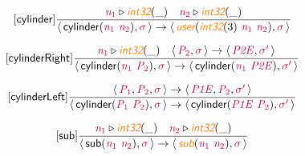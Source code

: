 \documentclass[10pt,leqno,fleqn]{article}
\newcommand{\artVariable}[1]{\mbox{\color{purple}\em #1\/}}
\newcommand{\artConstructor}[1]{\mbox{\sf #1}}
\newcommand{\artSpecial}[1]{\mbox{\color{orange}\sf\em #1}}
\begin{document}
\begin{equation}
\tag*{[\artConstructor{\sf cylinder}]}
\begin{split}\frac{ \artVariable{n$_{1}$}\triangleright \artSpecial{int32}(\_) \quad  \artVariable{n$_{2}$}\triangleright \artSpecial{int32}(\_) }{\langle\, \artConstructor{\sf cylinder}(\artVariable{n$_{1}$}\ \artVariable{n$_{2}$}), \artVariable{$\sigma$}\,\rangle \rightarrow \langle\, \artSpecial{user}(\artSpecial{int32}(3)\ \artVariable{n$_{1}$}\ \artVariable{n$_{2}$}), \artVariable{$\sigma$}\,\rangle }
\end{split}
\end{equation}

\begin{equation}
\tag*{[\artConstructor{\sf cylinderRight}]}
\begin{split}\frac{ \artVariable{n$_{1}$}\triangleright \artSpecial{int32}(\_) \quad \langle\, \artVariable{P$_{2}$}, \artVariable{$\sigma$}\,\rangle \rightarrow \langle\, \artVariable{P2E}, \artVariable{$\sigma$\/$^\prime$}\,\rangle }{\langle\, \artConstructor{\sf cylinder}(\artVariable{n$_{1}$}\ \artVariable{P$_{2}$}), \artVariable{$\sigma$}\,\rangle \rightarrow \langle\, \artConstructor{\sf cylinder}(\artVariable{n$_{1}$}\ \artVariable{P2E}), \artVariable{$\sigma$\/$^\prime$}\,\rangle }
\end{split}
\end{equation}

\begin{equation}
\tag*{[\artConstructor{\sf cylinderLeft}]}
\begin{split}\frac{\langle\, \artVariable{P$_{1}$}, \artVariable{P$_{2}$}, \artVariable{$\sigma$}\,\rangle \rightarrow \langle\, \artVariable{P1E}, \artVariable{P$_{2}$}, \artVariable{$\sigma$\/$^\prime$}\,\rangle }{\langle\, \artConstructor{\sf cylinder}(\artVariable{P$_{1}$}\ \artVariable{P$_{2}$}), \artVariable{$\sigma$}\,\rangle \rightarrow \langle\, \artConstructor{\sf cylinder}(\artVariable{P1E}\ \artVariable{P$_{2}$}), \artVariable{$\sigma$\/$^\prime$}\,\rangle }
\end{split}
\end{equation}

\begin{equation}
\tag*{[\artConstructor{\sf sub}]}
\begin{split}\frac{ \artVariable{n$_{1}$}\triangleright \artSpecial{int32}(\_) \quad  \artVariable{n$_{2}$}\triangleright \artSpecial{int32}(\_) }{\langle\, \artConstructor{\sf sub}(\artVariable{n$_{1}$}\ \artVariable{n$_{2}$}), \artVariable{$\sigma$}\,\rangle \rightarrow \langle\, \artSpecial{sub}(\artVariable{n$_{1}$}\ \artVariable{n$_{2}$}), \artVariable{$\sigma$}\,\rangle }
\end{split}
\end{equation}
\end{document}
